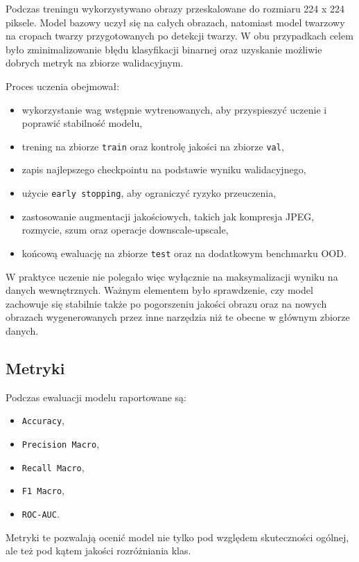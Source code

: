 Podczas treningu wykorzystywano obrazy przeskalowane do rozmiaru 224 x 224 piksele. Model bazowy uczył się na całych obrazach, natomiast model twarzowy na cropach twarzy przygotowanych po detekcji twarzy. W obu przypadkach celem było zminimalizowanie błędu klasyfikacji binarnej oraz uzyskanie możliwie dobrych metryk na zbiorze walidacyjnym.

Proces uczenia obejmował:

\begin{itemize}
    \item wykorzystanie wag wstępnie wytrenowanych, aby przyspieszyć uczenie i poprawić stabilność modelu,
    \item trening na zbiorze \texttt{train} oraz kontrolę jakości na zbiorze \texttt{val},
    \item zapis najlepszego checkpointu na podstawie wyniku walidacyjnego,
    \item użycie \texttt{early stopping}, aby ograniczyć ryzyko przeuczenia,
    \item zastosowanie augmentacji jakościowych, takich jak kompresja JPEG, rozmycie, szum oraz operacje downscale-upscale,
    \item końcową ewaluację na zbiorze \texttt{test} oraz na dodatkowym benchmarku OOD.
\end{itemize}

W praktyce uczenie nie polegało więc wyłącznie na maksymalizacji wyniku na danych wewnętrznych. Ważnym elementem było sprawdzenie, czy model zachowuje się stabilnie także po pogorszeniu jakości obrazu oraz na nowych obrazach wygenerowanych przez inne narzędzia niż te obecne w głównym zbiorze danych.

\newpage
\subsection{Metryki}

Podczas ewaluacji modelu raportowane są:

\begin{itemize}
    \item \texttt{Accuracy},
    \item \texttt{Precision Macro},
    \item \texttt{Recall Macro},
    \item \texttt{F1 Macro},
    \item \texttt{ROC-AUC}.
\end{itemize}

Metryki te pozwalają ocenić model nie tylko pod względem skuteczności ogólnej, ale też pod kątem jakości rozróżniania klas.


